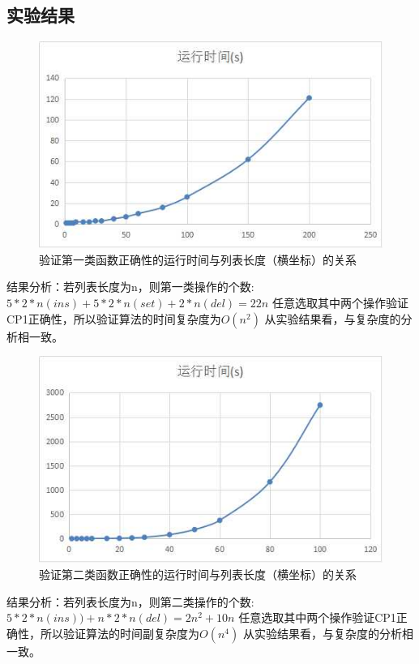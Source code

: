 \subsection{实验结果}
\begin{figure}[H]
\centering
\includegraphics{figures/runtime1.jpg}
\caption{验证第一类函数正确性的运行时间与列表长度（横坐标）的关系}
\end{figure}
\par 结果分析：若列表长度为n，则第一类操作的个数:$5*2*n(ins)+5*2*n(set)+2*n(del) = 22n$
任意选取其中两个操作验证CP1正确性，所以验证算法的时间复杂度为$O(n^2)$
从实验结果看，与复杂度的分析相一致。

\begin{figure}[H]
\centering
\includegraphics{figures/runtime2.jpg}
\caption{验证第二类函数正确性的运行时间与列表长度（横坐标）的关系}
\end{figure}
\par 结果分析：若列表长度为n，则第二类操作的个数:$5*2*n(ins))+n*2*n(del) = 2n^2+10n$
任意选取其中两个操作验证CP1正确性，所以验证算法的时间副复杂度为$O(n^4)$
从实验结果看，与复杂度的分析相一致。

